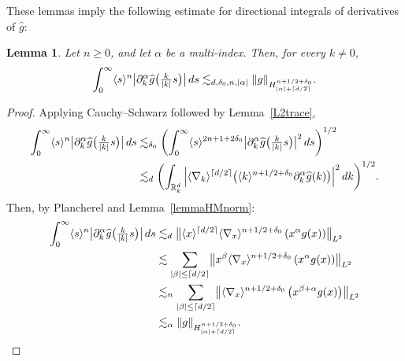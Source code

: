 \documentclass[10pt,a4paper]{article}
\newcommand{\bnorm}[1]{\bigl\|#1\bigr\|}
\newcommand{\babs}[1]{\bigl|#1\bigr|}
\theoremstyle{plain}
\newtheorem{lemma}[theorem]{Lemma}
\theoremstyle{remark}
\newcommand{\br}[1]{\left(#1\right)}
\newcommand{\bbr}[1]{\bigl(#1 \bigr)}
\newcommand{\bbbr}[1]{\biggl(#1 \biggr)}
\newcommand{\aal}{\abs{\alpha}}
\newcommand{\p}{\partial}
\newcommand{\jb}[1]{\langle#1\rangle}
\newcommand{\mytextfrac}[2]{{\textstyle\frac{#1}{#2}}}
\newcommand{\R}{\mathbb{R}}
\newcommand{\intRdk}{\int_{\R^d_k}}
\newcommand{\ceils}[1]{\lceil#1\rceil}
\begin{document}
These lemmas imply the following estimate for directional integrals of derivatives of \( \widehat{g} \):
\begin{lemma}\label{gnorm}
Let \( n \geq 0 \), and let \( \alpha \) be a multi-index. Then, for every $k\neq0$,
\begin{align*}
\int_0^\infty\jb{s}^{n}\babs{\p^\alpha_k\widehat g\bbr{\mytextfrac{k}{\abs{k}}s}}\,ds\lesssim_{d,
\delta_0,n,\aal}\norm{g}_{H^{n+{{1/2}}+\delta_0}_{\aal+\ceils{d/2}}}.\end{align*}
\end{lemma}
\begin{proof}
Applying Cauchy--Schwarz followed by Lemma~\ref{L2trace},
\begin{align*}
\int_0^\infty\jb{s}^{n}\babs{\p^\alpha_k\widehat g\bbr{\mytextfrac{k}{\abs{k}}s}}\,ds&\lesssim_{\delta_0}\br{\int_0^\infty\jb{s}^{2n+1+2\delta_0}\babs{\p^\alpha_k\widehat g\bbr{\mytextfrac{k}{\abs{k}}s}}^2\,ds}^{{1/2}}\\
&\lesssim_{d}\bbbr{\intRdk\abs{\jb{\nabla_k}^{\ceils{d/2}}\bbr{\jb{k}^{n+{{1/2}}+\delta_0}\p^\alpha_k\widehat g(k)}}^2\,dk}^{{1/2}}.
\end{align*}
Then, by Plancherel and Lemma~\ref{lemmaHMnorm}:
\begin{align*}
\int_0^\infty\jb{s}^{n}\babs{\p^\alpha_k\widehat g\bbr{\mytextfrac{k}{\abs{k}}s}}\,ds&\lesssim_d\bnorm{\jb{x}^{\ceils{d/2}}\jb{\nabla_x}^{n+{{1/2}}+\delta_0}\br{x^\alpha g(x)}}_{L^2}\\
&\lesssim\sum_{\abs{\beta}\leq\ceils{d/2}}\bnorm{x^\beta\jb{\nabla_x}^{n+{{1/2}}+\delta_0}\br{x^\alpha g(x)}}_{L^2}\\
&\lesssim_n\sum_{\abs{\beta}\leq\ceils{d/2}}\bnorm{\jb{\nabla_x}^{n+{{1/2}}+\delta_0}\br{x^{\beta+\alpha} g(x)}}_{L^2}\\
&\lesssim_\alpha\norm{g}_{H_{\aal+\ceils{d/2}}^{n+{{1/2}}+\delta_0}}.\qedhere
\end{align*}
\end{proof}
\end{document}
